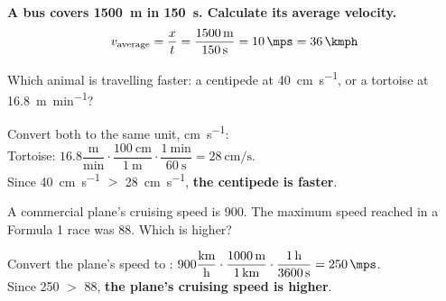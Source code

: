 \begin{example}
    \textbf{A bus covers \qty{1500}{\m} in \qty{150}{\s}. Calculate its average velocity.}
    \begin{equation*}
        v_{\text{average}} = \dfrac{x}{t} = \dfrac{\qty{1500}{\m}}{\qty{150}{\s}} = \qty{10}{\mps} = \qty{36}{\kmph}
    \end{equation*}
\end{example}

\begin{exercise}
    Which animal is travelling faster: a centipede at \qty{40}{\cm\per\s}, or a tortoise at \qty{16.8}{\m\per\minute}?
    \begin{solu}
        Convert both to the same unit, \unit{\cm\per\s}: \\
        Tortoise: \(16.8 \dfrac{\text{m}}{\text{min}} \cdot \dfrac{\qty{100}{\cm}}{\qty{1}{\m}} \cdot \dfrac{\qty{1}{\minute}}{\qty{60}{\s}} = \qty{28}{\cm\per\s}\). \\
        Since \qty{40}{\cm\per\s} \(>\) \qty{28}{\cm\per\s}, \textbf{the centipede is faster}.
    \end{solu}
\end{exercise}

\begin{exercise}
    A commercial plane's cruising speed is \qty{900}{\kmph}. The maximum speed reached in a Formula 1 race was \qty{88}{\mps}. Which is higher?
    \begin{solu}
        Convert the plane's speed to \unit{\mps}: \(900 \dfrac{\text{km}}{\text{h}} \cdot \dfrac{\qty{1000}{\m}}{\qty{1}{\km}} \cdot \dfrac{\qty{1}{\hour}}{\qty{3600}{\s}} = \qty{250}{\mps}\). \\
        Since \qty{250}{\mps} \(>\) \qty{88}{\mps}, \textbf{the plane's cruising speed is higher}.
    \end{solu}
\end{exercise}

